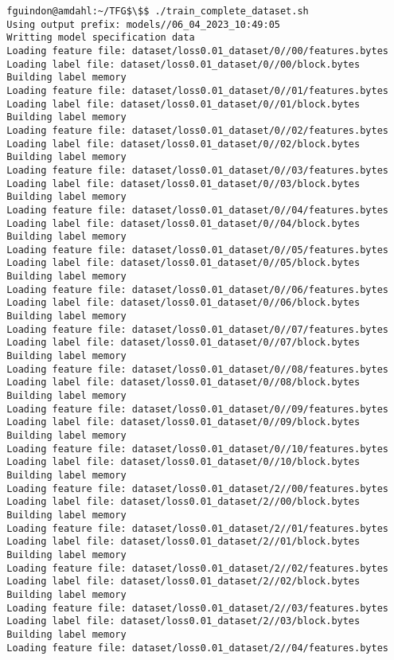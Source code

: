 \documentclass[12pt,oneside]{book}
\begin{document}
\begin{lstlisting}
  fguindon@amdahl:~/TFG$\$$ ./train_complete_dataset.sh
  Using output prefix: models//06_04_2023_10:49:05
  Writting model specification data
  Loading feature file: dataset/loss0.01_dataset/0//00/features.bytes
  Loading label file: dataset/loss0.01_dataset/0//00/block.bytes
  Building label memory
  Loading feature file: dataset/loss0.01_dataset/0//01/features.bytes
  Loading label file: dataset/loss0.01_dataset/0//01/block.bytes
  Building label memory
  Loading feature file: dataset/loss0.01_dataset/0//02/features.bytes
  Loading label file: dataset/loss0.01_dataset/0//02/block.bytes
  Building label memory
  Loading feature file: dataset/loss0.01_dataset/0//03/features.bytes
  Loading label file: dataset/loss0.01_dataset/0//03/block.bytes
  Building label memory
  Loading feature file: dataset/loss0.01_dataset/0//04/features.bytes
  Loading label file: dataset/loss0.01_dataset/0//04/block.bytes
  Building label memory
  Loading feature file: dataset/loss0.01_dataset/0//05/features.bytes
  Loading label file: dataset/loss0.01_dataset/0//05/block.bytes
  Building label memory
  Loading feature file: dataset/loss0.01_dataset/0//06/features.bytes
  Loading label file: dataset/loss0.01_dataset/0//06/block.bytes
  Building label memory
  Loading feature file: dataset/loss0.01_dataset/0//07/features.bytes
  Loading label file: dataset/loss0.01_dataset/0//07/block.bytes
  Building label memory
  Loading feature file: dataset/loss0.01_dataset/0//08/features.bytes
  Loading label file: dataset/loss0.01_dataset/0//08/block.bytes
  Building label memory
  Loading feature file: dataset/loss0.01_dataset/0//09/features.bytes
  Loading label file: dataset/loss0.01_dataset/0//09/block.bytes
  Building label memory
  Loading feature file: dataset/loss0.01_dataset/0//10/features.bytes
  Loading label file: dataset/loss0.01_dataset/0//10/block.bytes
  Building label memory
  Loading feature file: dataset/loss0.01_dataset/2//00/features.bytes
  Loading label file: dataset/loss0.01_dataset/2//00/block.bytes
  Building label memory
  Loading feature file: dataset/loss0.01_dataset/2//01/features.bytes
  Loading label file: dataset/loss0.01_dataset/2//01/block.bytes
  Building label memory
  Loading feature file: dataset/loss0.01_dataset/2//02/features.bytes
  Loading label file: dataset/loss0.01_dataset/2//02/block.bytes
  Building label memory
  Loading feature file: dataset/loss0.01_dataset/2//03/features.bytes
  Loading label file: dataset/loss0.01_dataset/2//03/block.bytes
  Building label memory
  Loading feature file: dataset/loss0.01_dataset/2//04/features.bytes

\end{lstlisting}
\end{document}
